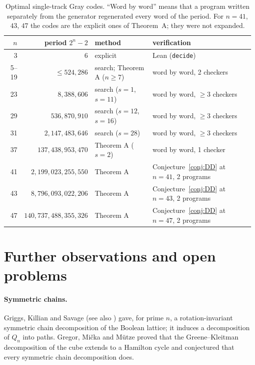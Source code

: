 \documentclass[11pt]{article}
\begin{document}
\begin{table}[h]
\centering
\begin{tabular}{rrll}
\toprule
$n$ & period $2^n-2$ & method & verification\\
\midrule
3 & $6$ & explicit & Lean (\texttt{decide})\\
5--19 & $\le 524{,}286$ & search; Theorem A ($n\ge7$) & word by word, 2 checkers\\
23 & $8{,}388{,}606$ & search ($s=1$, $s=11$) & word by word, $\ge3$ checkers\\
29 & $536{,}870{,}910$ & search ($s=12$, $s=16$) & word by word, $\ge3$ checkers\\
31 & $2{,}147{,}483{,}646$ & search ($s=28$) & word by word, $\ge3$ checkers\\
37 & $137{,}438{,}953{,}470$ & Theorem A ($s=2$) & word by word, 1 checker\\
41 & $2{,}199{,}023{,}255{,}550$ & Theorem A & Conjecture~\ref{conj:DD} at $n=41$, 2 programs\\
43 & $8{,}796{,}093{,}022{,}206$ & Theorem A & Conjecture~\ref{conj:DD} at $n=43$, 2 programs\\
47 & $140{,}737{,}488{,}355{,}326$ & Theorem A & Conjecture~\ref{conj:DD} at $n=47$, 2 programs\\
\bottomrule
\end{tabular}
\caption{Optimal single-track Gray codes. ``Word by word'' means that a program written separately from the generator
regenerated every word of the period. For $n=41$, $43$, $47$ the codes are the explicit ones of Theorem~A; they were
not expanded.}
\end{table}

\section{Further observations and open problems}\label{sec:open}

\paragraph{Symmetric chains.} Griggs, Killian and Savage \cite{GKS04} (see also \cite{KRSW04}) gave, for prime $n$, a
rotation-invariant symmetric chain decomposition of the Boolean lattice; it induces a decomposition of $Q_n$ into
paths. Gregor, Mi\v{c}ka and M\"utze \cite{GMM} proved that the Greene--Kleitman decomposition of the cube extends to a
Hamilton cycle and conjectured that every symmetric chain decomposition does.
\end{document}
